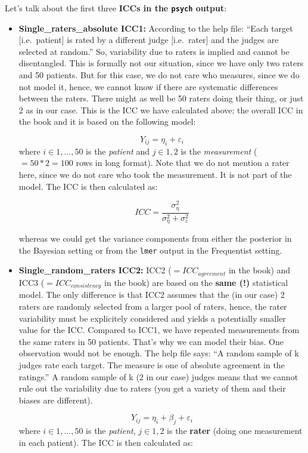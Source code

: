 \documentclass[
]{book}
\begin{document}
Let's talk about the first three \textbf{ICCs in the \texttt{psych} output}:

\begin{itemize}
\item
  \textbf{Single\_raters\_absolute ICC1:}
  According to the help file: ``Each target {[}i.e.~patient{]} is rated by a different
  judge {[}i.e.~rater{]} and the judges are selected at random.'' So, variability due to raters
  is implied and cannot be disentangled.
  This is formally not our situation, since we have only two raters and
  50 patients. But for this case, we do not care who measures, since we do not
  model it, hence, we cannot know if there are systematic differences between
  the raters. There might as well be 50 raters doing their thing, or just 2 as in our case.
  This is the ICC we have calculated above; the overall ICC
  in the book and it is based on the following model:

  \[Y_{ij} = \eta_i + \varepsilon_i\]
  where \(i \in {1,...,50}\) is the \emph{patient} and \(j \in {1,2}\) is the \emph{measurement}
  (\(=50*2=100\) rows in long format).
  Note that we do not mention a rater here, since we do not care who took the
  measurement. It is not part of the model. The ICC is then calculated as:

  \[ICC = \frac{\sigma_{\eta}^2}{\sigma_{\eta}^2 + \sigma_{\varepsilon}^2}\]

  whereas we could get the variance components from either the posterior in the Bayesian
  setting or from the \texttt{lmer} output in the Frequentist setting.
\item
  \textbf{Single\_random\_raters ICC2:}
  ICC2 (\(=ICC_{agreement}\) in the book) and ICC3 (\(=ICC_{consistency}\) in the book)
  are based on the \textbf{same (!)} statistical model. The only difference is
  that ICC2 assumes that the (in our case) 2 raters are randomly selected from a larger pool of raters,
  hence, the rater variability must be explicitely considered and yields a potentially smaller
  value for the ICC. Compared to ICC1, we have repeated measurements from the same raters
  in 50 patients. That's why we can model their bias. One observation would not be enough.
  The help file says: ``A random sample of k judges rate each target.
  The measure is one of absolute agreement in the ratings.''
  A random sample of k (2 in our case) judges means that we cannot rule out the variability
  due to raters (you get a variety of them and their biases are different).

  \[Y_{ij} = \eta_i + \beta_j + \varepsilon_i\]
  where \(i \in {1,...,50}\) is the \emph{patient}, \(j \in {1,2}\) is the \textbf{rater}
  (doing one measurement in each patient). The ICC is then calculated as:


\end{itemize}
\end{document}

